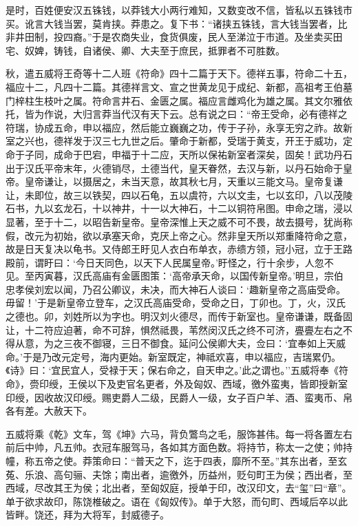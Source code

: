 \documentclass[]{article}
\begin{document}
是时，百姓便安汉五铢钱，以莽钱大小两行难知，又数变改不信，皆私以五铢钱市买。讹言大钱当罢，莫肯挟。莽患之。复下书：``诸挟五铢钱，言大钱当罢者，比非井田制，投四裔。''于是农商失业，食货俱废，民人至涕泣于市道。及坐卖买田宅、奴婢，铸钱，自诸侯、卿、大夫至于庶民，抵罪者不可胜数。

秋，遣五威将王奇等十二人班《符命》四十二篇于天下。德祥五事，符命二十五，福应十二，凡四十二篇。其德祥言文、宣之世黄龙见于成纪、新都，高祖考王伯墓门梓柱生枝叶之属。符命言井石、金匮之属。福应言雌鸡化为雄之属。其文尔雅依托，皆为作说，大归言莽当代汉有天下云。总有说之曰：``帝王受命，必有德祥之符瑞，协成五命，申以福应，然后能立巍巍之功，传于子孙，永享无穷之祚。故新室之兴也，德祥发于汉三七九世之后。肇命于新都，受瑞于黄支，开王于威功，定命于子同，成命于巴宕，申福于十二应，天所以保祐新室者深矣，固矣！武功丹石出于汉氏平帝末年，火德销尽，土德当代，皇天眷然，去汉与新，以丹石始命于皇帝。皇帝谦让，以摄居之，未当天意，故其秋七月，天重以三能文马。皇帝复谦让，未即位，故三以铁契，四以石龟，五以虞符，六以文圭，七以玄印，八以茂陵石书，九以玄龙石，十以神井，十一以大神石，十二以铜符帛图。申命之瑞，浸以显著，至于十二，以昭告新皇帝。皇帝深惟上天之威不可不畏，故去摄号，犹尚称假，改元为初始，欲以承塞天命，克厌上帝之心。然非皇天所以郑重降符命之意，故是日天复决以龟书。又侍郎王盱见人衣白布单衣，赤缋方领，冠小冠，立于王路殿前，谓盱曰：`今日天同色，以天下人民属皇帝。'盱怪之，行十余步，人忽不见。至丙寅暮，汉氏高庙有金匮图策：`高帝承天命，以国传新皇帝。'明旦，宗伯忠孝侯刘宏以闻，乃召公卿议，未决，而大神石人谈曰：`趣新皇帝之高庙受命。毋留！'于是新皇帝立登车，之汉氏高庙受命，受命之日，丁卯也。丁，火，汉氏之德也。卯，刘姓所以为字也。明汉刘火德尽，而传于新室也。皇帝谦谦，既备固让，十二符应迫著，命不可辞，惧然祗畏，苇然闵汉氏之终不可济，亹亹左右之不得从意，为之三夜不御寝，三日不御食。延问公侯卿大夫，佥曰：`宜奉如上天威命。'于是乃改元定号，海内更始。新室既定，神祗欢喜，申以福应，吉瑞累仍。《诗》曰：`宜民宜人，受禄于天；保右命之，自天申之。'此之谓也。''五威将奉《符命》，赍印绶，王侯以下及吏官名更者，外及匈奴、西域，徼外蛮夷，皆即授新室印绶，因收故汉印绶。赐吏爵人二级，民爵人一级，女子百户羊、酒、蛮夷币、帛各有差。大赦天下。

五威将乘《乾》文车，驾《坤》六马，背负鷩鸟之毛，服饰甚伟。每一将各置左右前后中帅，凡五帅。衣冠车服驾马，各如其方面色数。将持节，称太一之使；帅持幢，称五帝之使。莽策命曰：``普天之下，迄于四表，靡所不至。''其东出者，至玄菟、乐浪、高句骊、夫馀；南出者，逾徼外，历益州，贬句町王为侯；西出者，至西域，尽改其王为侯；北出者，至匈奴庭，授单于印，改汉印文，去``玺''曰``章''。单于欲求故印，陈饶椎破之。语在《匈奴传》。单于大怒，而句町、西域后卒以此皆畔。饶还，拜为大将军，封威德子。
\end{document}
